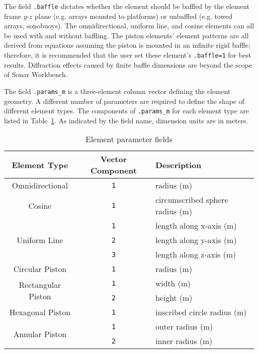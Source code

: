 The field \texttt{.baffle} dictates whether the element should be baffled by the element frame $y$-$z$ plane (e.g. arrays mounted to platforms) or unbaffled (e.g. towed arrays, sonobuoys). The omnidirectional, uniform line, and cosine elements can all be used with and without baffling. The piston elements' element patterns are all derived from equations assuming the piston is mounted in an infinite rigid baffle; therefore, it is recommended that the user set these element's \texttt{.baffle=1} for best results. Diffraction effects caused by finite baffle dimensions are beyond the scope of Sonar Workbench. 

The field \texttt{.params\_m} is a three-element column vector defining the element geometry. A different number of parameters are required to define the shape of different element types. The components of \texttt{.params\_m} for each element type are listed in Table~\ref{tab:ElementParams}. As indicated by the field name, dimension units are in meters.

\begin{table}[!ht]
	\begin{center}
		\caption{Element parameter fields}
		\label{tab:ElementParams}
		\begin{tabular}{c|c|l} 
			\textbf{Element Type} & \textbf{Vector Component} & \textbf{Description} \\
			\hline
			Omnidirectional & \texttt{1} & radius (m)\\
			\hline
			Cosine & \texttt{1} & circumscribed sphere radius (m)\\
			\hline
			\multirow{3}{*}{Uniform Line} & \texttt{1} & length along x-axis (m)\\
			& \texttt{2} & length along y-axis (m)\\
			& \texttt{3} & length along z-axis (m)\\
			\hline
			Circular Piston & \texttt{1} & radius (m)\\
			\hline
			\multirow{2}{*}{Rectangular Piston} & \texttt{1} & width (m)\\
			& \texttt{2} & height (m)\\
			\hline
			Hexagonal Piston & \texttt{1} & inscribed circle radius (m)\\	
			\hline
			\multirow{2}{*}{Annular Piston} & \texttt{1} & outer radius (m)\\
			& \texttt{2} & inner radius (m)\\
		\end{tabular}
	\end{center}
\end{table}

